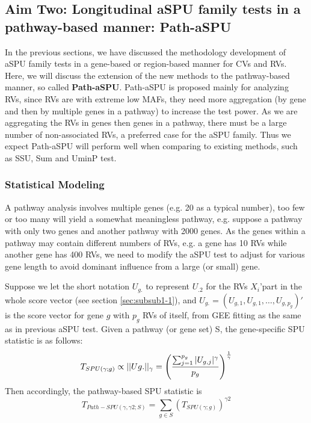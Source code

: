 \documentclass[12pt]{article}
\begin{document}
\subsection{Aim Two: Longitudinal aSPU family tests in a pathway-based manner: Path-aSPU}
\label{sec:aim2}
In the previous sections, we have discussed the methodology development of aSPU family tests in a gene-based or region-based manner for CVs and RVs. Here, we will discuss the extension of the new methods to the pathway-based manner, so called \textbf{Path-aSPU}. Path-aSPU is proposed mainly for analyzing RVs, since RVs are with extreme low MAFs, they need more aggregation (by gene and then by multiple genes in a pathway) to increase the test power. As we are aggregating the RVs in genes then genes in a pathway, there must be a large number of non-associated RVs, a preferred case for the aSPU family. Thus we expect Path-aSPU will perform well when comparing to existing methods, such as SSU, Sum and UminP test. 
\subsubsection{Statistical Modeling}\label{sec:aim2-1}
A pathway analysis involves multiple genes (e.g. 20 as a typical number), too few or too many will yield a somewhat meaningless pathway, e.g. suppose a pathway with only two genes and another pathway with 2000 genes. As the genes within a pathway may contain different numbers of RVs, e.g. a gene has 10 RVs while another gene has 400 RVs, we need to modify the aSPU test to adjust for various gene length to avoid dominant influence from a large (or small) gene.

Suppose we let the short notation $U_{g.}$ to represent $U_{.2}$ for the RVs $X_i$'part in the whole score vector (see section \ref{sec:subsub1-1}), and $U_{g.} = (U_{g,1},U_{g,1},\ldots, U_{g,p_g})'$ is the score vector for gene $g$ with $p_g$ RVs of itself, from GEE fitting as the same as in previous aSPU test. Given a pathway (or gene set) S, the gene-specific SPU statistic is as follows:
\begin{equation}
T_ { SPU(\gamma ; g) } \propto || Ug.||_{\gamma} =  \left( \frac{  \sum_{j=1} ^ {p_g} |U_{g, j}| ^ { \gamma }  }{p_g} \right) ^ { 1 \over \gamma }
\end{equation}  
Then accordingly, the pathway-based SPU statistic is
\begin{equation}
T _ { Path-SPU(\gamma, \gamma2 ; S) } = \sum_{g \in S} ( T_ { SPU(\gamma ; g) } ) ^ {\gamma2}
\end{equation}  
\end{document}
